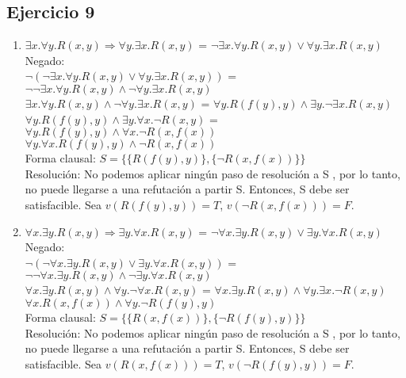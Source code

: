 \documentclass[10pt,a4paper]{article}
\begin{document}
\subsection{Ejercicio 9}
    \begin{enumerate}
    \item
    $\exists x. \forall y. R(x,y) \Rightarrow \forall y. \exists x. R(x,y)$  =  $\neg \exists x. \forall y. R(x,y) \vee \forall y. \exists x. R(x,y)$ \\
    Negado: \\
    $\neg (\neg \exists x. \forall y. R(x,y) \vee \forall y. \exists x. R(x,y))$  =  $ \neg \neg \exists x. \forall y. R(x,y) \wedge \neg \forall y. \exists x. R(x,y) $ \\
    $ \exists x. \forall y. R(x,y) \wedge \neg \forall y. \exists x. R(x,y) $  =  $ \forall y. R(f(y),y) \wedge \exists y. \neg \exists x. R(x,y) $ \\
    $ \forall y. R(f(y),y) \wedge \exists y. \forall x. \neg R(x,y) $  =  $ \forall y. R(f(y),y) \wedge \forall x. \neg R(x,f(x)) $ \\
    $ \forall y. \forall x.  R(f(y),y) \wedge \neg R(x,f(x)) $ \\
    Forma clausal: $S=\{\{ R(f(y),y)\},\{ \neg R(x,f(x))\} \}$ \\
    Resolución: No podemos aplicar ningún paso de resolución a S , por lo tanto, no puede llegarse a una refutación a partir S. Entonces, S debe ser satisfacible. Sea $v(R(f(y),y))=T$, $v(\neg R(x,f(x)))=F$.
    \item
    $\forall x. \exists y. R(x,y) \Rightarrow \exists y. \forall x. R(x,y)$  =  $\neg \forall x. \exists y. R(x,y) \vee \exists y. \forall x. R(x,y)$ \\
    Negado: \\
    $\neg (\neg \forall x. \exists y. R(x,y) \vee \exists y. \forall x. R(x,y))$  =  $\neg \neg \forall x. \exists y. R(x,y) \wedge \neg \exists y. \forall x. R(x,y)$ \\
    $\forall x. \exists y. R(x,y) \wedge \forall y. \neg \forall x. R(x,y)$  =  $\forall x. \exists y. R(x,y) \wedge \forall y. \exists x. \neg R(x,y)$ \\
    $\forall x. R(x,f(x)) \wedge \forall y. \neg R(f(y),y)$ \\
    Forma clausal: $S=\{ \{ R(x,f(x))\},\{ \neg R(f(y),y) \}\}$ \\
    Resolución: No podemos aplicar ningún paso de resolución a S  , por lo tanto, no puede llegarse a una refutación a partir S. Entonces, S debe ser satisfacible. Sea $v(R(x,f(x)))=T$, $v(\neg R(f(y),y))=F$.

\end{enumerate}
\end{document}
